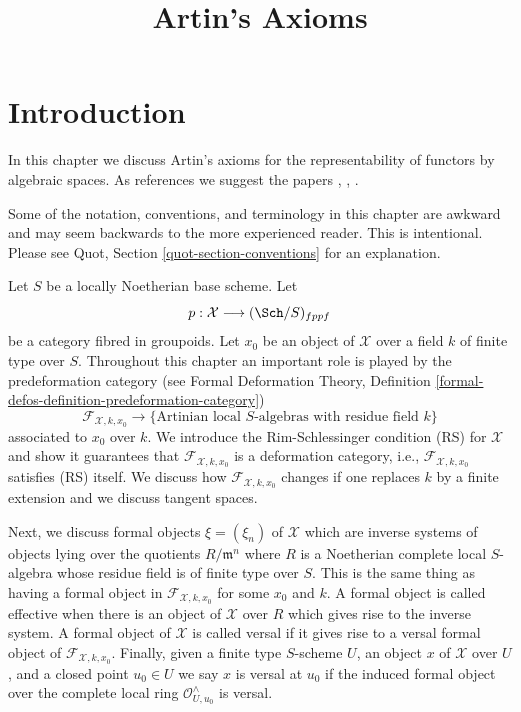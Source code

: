 

%


\title{Artin's Axioms}

\maketitle

\label{section-phantom}

\tableofcontents




\section{Introduction}
\label{section-introduction}

\noindent
In this chapter we discuss Artin's axioms for the representability of
functors by algebraic spaces. As references we suggest the papers
\cite{ArtinI}, \cite{ArtinII}, \cite{ArtinVersal}.

\medskip\noindent
Some of the notation, conventions, and terminology in this chapter are awkward
and may seem backwards to the more experienced reader. This is intentional.
Please see Quot, Section \ref{quot-section-conventions} for an
explanation.

\medskip\noindent
Let $S$ be a locally Noetherian base scheme. Let
$$
p : \mathcal{X} \longrightarrow (\Sch/S)_{fppf}
$$
be a category fibred in groupoids. Let $x_0$ be an object of $\mathcal{X}$
over a field $k$ of finite type over $S$. Throughout this chapter an important
role is played by the predeformation category
(see Formal Deformation Theory,
Definition \ref{formal-defos-definition-predeformation-category})
$$
\mathcal{F}_{\mathcal{X}, k, x_0}
\longrightarrow
\{\text{Artinian local }S\text{-algebras with residue field }k\}
$$
associated to $x_0$ over $k$. We introduce the Rim-Schlessinger condition (RS)
for $\mathcal{X}$ and show it guarantees that
$\mathcal{F}_{\mathcal{X}, k, x_0}$ is a deformation category, i.e.,
$\mathcal{F}_{\mathcal{X}, k, x_0}$ satisfies (RS) itself.
We discuss how $\mathcal{F}_{\mathcal{X}, k, x_0}$
changes if one replaces $k$ by a finite extension
and we discuss tangent spaces.

\medskip\noindent
Next, we discuss formal objects $\xi = (\xi_n)$ of $\mathcal{X}$ which are
inverse systems of objects lying over the quotients $R/\mathfrak m^n$
where $R$ is a Noetherian complete local $S$-algebra whose residue field
is of finite type over $S$. This is the same thing as having a formal
object in $\mathcal{F}_{\mathcal{X}, k, x_0}$ for some $x_0$ and $k$.
A formal object is called effective when there is an object of
$\mathcal{X}$ over $R$ which gives rise to the inverse system.
A formal object of $\mathcal{X}$ is called versal if it gives rise to a
versal formal object of $\mathcal{F}_{\mathcal{X}, k, x_0}$.
Finally, given a finite type $S$-scheme $U$, an object $x$
of $\mathcal{X}$ over $U$, and a closed point $u_0 \in U$ we say
$x$ is versal at $u_0$ if the induced formal object over the complete
local ring $\mathcal{O}_{U, u_0}^\wedge$ is versal.

